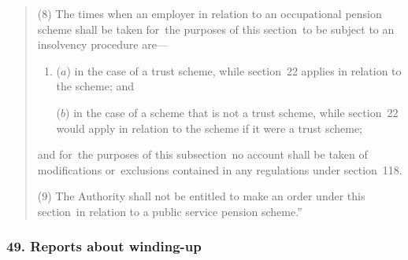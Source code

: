 \documentclass[12pt,a4paper]{article}
\begin{document}
\begin{quotation}
(8) The times when an employer in relation to an occupational pension scheme shall be taken for~the purposes of this section~to be subject to an insolvency procedure are—
\begin{enumerate}\item[]
($a$) in the case of a trust scheme, while section~22 applies in relation to the scheme; and

($b$) in the case of a scheme that is not a trust scheme, while section~22 would apply in relation to the scheme if it were a trust scheme;
\end{enumerate}
and for~the purposes of this subsection~no account shall be taken of modifications or~exclusions contained in any regulations under section~118. 

(9) The Authority shall not be entitled to make an order under this section~in relation to a public service pension scheme.”
\end{quotation}

\subsubsection{49. Reports about winding-up}
\end{document}
